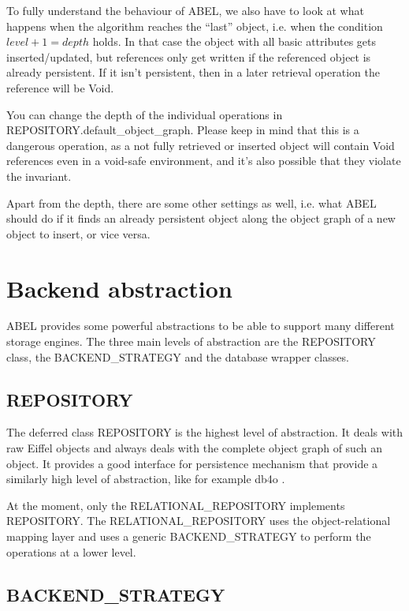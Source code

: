 To fully understand the behaviour of ABEL, we also have to look at what happens when the algorithm reaches the ``last'' object, i.e. when the condition $level + 1 = depth$ holds.
In that case the object with all basic attributes gets inserted/updated, but references only get written if the referenced object is already persistent.
If it isn't persistent, then in a later retrieval operation the reference will be Void.

You can change the depth of the individual operations in REPOSITORY.default\_object\_graph. 
Please keep in mind that this is a dangerous operation, as a not fully retrieved or inserted object will contain Void references even in a void-safe environment, and it's also possible that they violate the invariant.

Apart from the depth, there are some other settings as well, i.e. what ABEL should do if it finds an already persistent object along the object graph of a new object to insert, or vice versa.

\section{Backend abstraction}

ABEL provides some powerful abstractions to be able to support many different storage engines. 
The three main levels of abstraction are the REPOSITORY class, the BACKEND\_STRATEGY and the database wrapper classes.

\subsection{REPOSITORY}

The deferred class REPOSITORY is the highest level of abstraction.
It deals with raw Eiffel objects and always deals with the complete object graph of such an object.
It provides a good interface for persistence mechanism that provide a similarly high level of abstraction, like for example db4o .

At the moment, only the RELATIONAL\_REPOSITORY implements REPOSITORY.
The RELATIONAL\_REPOSITORY uses the object-relational mapping layer and uses a generic BACKEND\_STRATEGY to perform the operations at a lower level.

\subsection{BACKEND\_STRATEGY}

